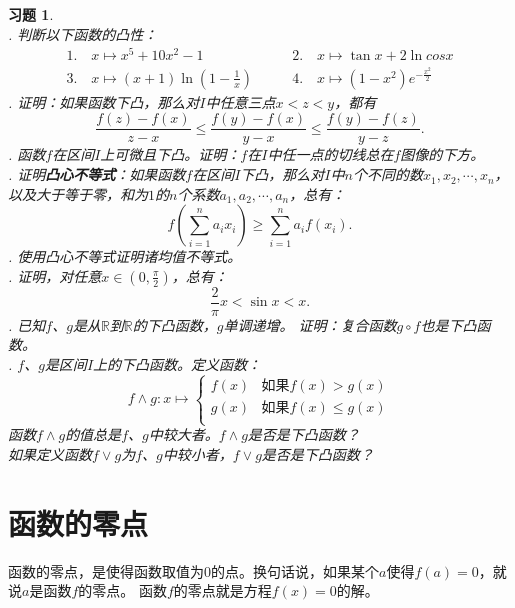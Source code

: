 \documentclass[12pt,UTF8]{ctexbook}
\newtheorem{xt}{习题}[section]
\begin{document}
\begin{xt}
    \mbox{} \\
    . 判断以下函数的凸性：
    $$
    \begin{array}{ll}
        1. \quad x \mapsto x^5 + 10x^2 - 1 \qquad &2. \quad x \mapsto \tan{x} + 2\ln{cos{x}} \\
        3. \quad x \mapsto (x+1)\ln{\left(1 - \frac{1}{x}\right)} \qquad &4. \quad x \mapsto \left(1 - x^2\right)e^{-\frac{x^2}{2}}
    \end{array}
    $$
    . 证明：如果函数下凸，那么对$I$中任意三点$x < z < y$，都有
    $$ \frac{f(z) - f(x)}{z - x} \leqslant \frac{f(y) - f(x)}{y - x}  \leqslant \frac{f(y) - f(z)}{y - z}. $$
    . 函数$f$在区间$I$上可微且下凸。证明：$f$在$I$中任一点的切线总在$f$图像的下方。\\
    . 证明\textbf{凸心不等式}：如果函数$f$在区间$I$下凸，那么对$I$中$n$个不同的数$x_1, x_2, \cdots , x_n$，
    以及大于等于零，和为$1$的$n$个系数$a_1, a_2, \cdots, a_n$，总有：
    $$ f\left(\sum_{i=1}^n a_i x_i\right) \geqslant \sum_{i=1}^n a_i f(x_i). $$
    . 使用凸心不等式证明诸均值不等式。\\
    . 证明，对任意$x\in\left(0, \frac{\pi}{2}\right)$，总有：
    $$ \frac{2}{\pi} x < \sin{x} < x.$$
    . 已知$f$、$g$是从$\mathbb{R}$到$\mathbb{R}$的下凸函数，$g$单调递增。
    证明：复合函数$g\circ f$也是下凸函数。\\
    . $f$、$g$是区间$I$上的下凸函数。定义函数：
    $$ f \wedge g : x \mapsto \left\{
        \begin{array}{cl}
            f(x) & \mbox{如果} f(x) > g(x) \\
            g(x) & \mbox{如果} f(x) \leqslant g(x) \\
        \end{array}
    \right.
    $$
    \indent 函数$f \wedge g$的值总是$f$、$g$中较大者。$f \wedge g$是否是下凸函数？\\
    \indent 如果定义函数$f \vee g$为$f$、$g$中较小者，$f \vee g$是否是下凸函数？

\end{xt}

\section{函数的零点}

函数的零点，是使得函数取值为$0$的点。换句话说，如果某个$a$使得$f(a) = 0$，就说$a$是函数$f$的零点。
函数$f$的零点就是方程$f(x) = 0$的解。
\end{document}
